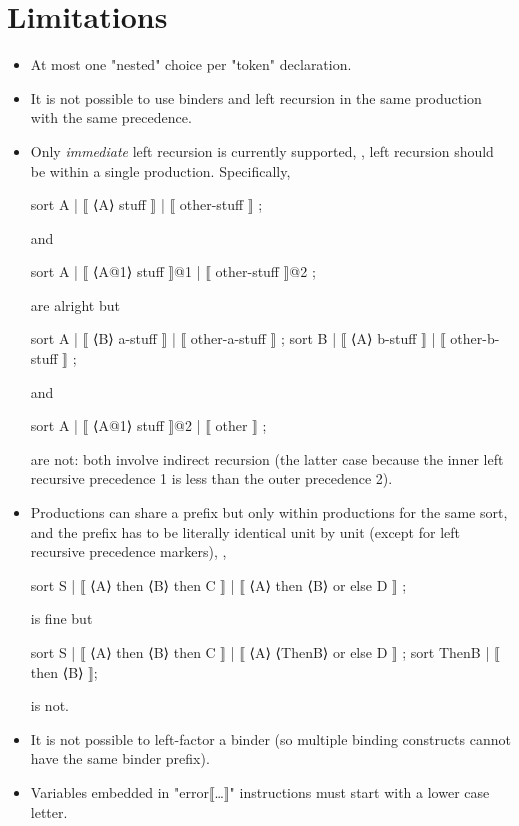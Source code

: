 \documentclass[11pt]{article} %
\begin{document}
\section{Limitations}\label{app:limits}

\begin{itemize}

\item At most one "nested" choice per "token" declaration.

\item It is not possible to use binders and left recursion in the same production with the same
  precedence.

\item Only \emph{immediate} left recursion is currently supported, \ie, left recursion should be
  within a single production. Specifically,
\begin{hacs}
sort A | ⟦ ⟨A⟩ stuff ⟧ | ⟦ other-stuff ⟧ ;
\end{hacs}
  and 
\begin{hacs}
sort A | ⟦ ⟨A@1⟩ stuff ⟧@1 | ⟦ other-stuff ⟧@2 ;
\end{hacs}
  are alright but
\begin{hacs}
sort A | ⟦ ⟨B⟩ a-stuff ⟧ | ⟦ other-a-stuff ⟧ ;
sort B | ⟦ ⟨A⟩ b-stuff ⟧ | ⟦ other-b-stuff ⟧ ;
\end{hacs}
  and 
\begin{hacs}
sort A  | ⟦ ⟨A@1⟩ stuff ⟧@2 | ⟦ other ⟧ ;
\end{hacs}
  are not: both involve indirect recursion (the latter case because the inner left recursive
  precedence 1 is less than the outer precedence 2). 

\item Productions can share a prefix but only within productions for the same sort, and the prefix
  has to be literally identical unit by unit (except for left recursive precedence markers), \ie,
\begin{code}
sort S | ⟦ ⟨A⟩ then ⟨B⟩ then C ⟧
       | ⟦ ⟨A⟩ then ⟨B⟩ or else D ⟧ ;
\end{code}
  is fine but
\begin{code}
sort S | ⟦ ⟨A⟩ then ⟨B⟩ then C ⟧
       | ⟦ ⟨A⟩ ⟨ThenB⟩ or else D ⟧ ;
sort ThenB | ⟦ then ⟨B⟩ ⟧;
\end{code}
  is not.

\item It is not possible to left-factor a binder (so multiple binding constructs cannot have the
  same binder prefix).

\item Variables embedded in "error⟦…⟧" instructions must start with a lower case letter.


\end{itemize}
\end{document}
